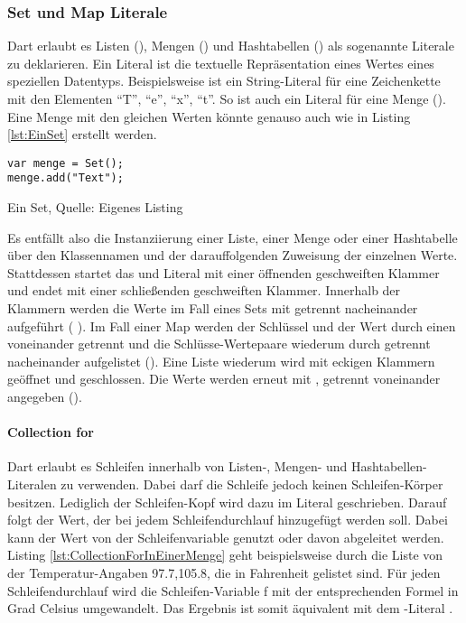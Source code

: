 \subsubsection{Set und Map Literale}

Dart erlaubt es Listen (), Mengen () und Hashtabellen () als sogenannte Literale zu deklarieren.
Ein Literal ist die textuelle Repräsentation eines Wertes eines speziellen Datentyps.
Beispielsweise ist   ein String-Literal für eine Zeichenkette mit den Elementen \enquote{T}, \enquote{e}, \enquote{x}, \enquote{t}.
So ist auch   ein Literal für eine Menge ().
Eine Menge mit den gleichen Werten könnte genauso auch wie in Listing \ref{lst:EinSet} erstellt werden.

\ifincludeall
  \begin{listing}[ht]
    \begin{verbatim}
var menge = Set();
menge.add("Text");
\end{verbatim}
    \caption[Ein Set]{Ein Set, Quelle: Eigenes Listing}
    \label{lst:EinSet}
  \end{listing}
\fi

Es entfällt also die Instanziierung einer Liste, einer Menge oder einer Hashtabelle über den Klassennamen und der darauffolgenden Zuweisung der einzelnen Werte.
Stattdessen startet das  und  Literal mit einer öffnenden geschweiften Klammer und endet mit einer schließenden geschweiften Klammer.
Innerhalb der Klammern werden die Werte im Fall eines Sets mit \IC{,} getrennt nacheinander aufgeführt (  ).
Im Fall einer Map werden der Schlüssel und der Wert durch einen \IC{:} voneinander getrennt und die Schlüsse-Wertepaare wiederum durch \IC{,} getrennt nacheinander aufgelistet ().
Eine Liste wiederum wird mit eckigen Klammern geöffnet und geschlossen.
Die Werte werden erneut mit , getrennt voneinander angegeben (\IC{[1,2]}).

\paragraph{Collection for} Dart erlaubt es Schleifen innerhalb von Listen-, Mengen- und Hashtabellen-Literalen zu verwenden.
Dabei darf die Schleife jedoch keinen Schleifen-Körper besitzen.
Lediglich der Schleifen-Kopf wird dazu im Literal geschrieben.
Darauf folgt der Wert, der bei jedem Schleifendurchlauf hinzugefügt werden soll.
Dabei kann der Wert von der Schleifenvariable genutzt oder davon abgeleitet werden.
Listing \ref{lst:CollectionForInEinerMenge} geht beispielsweise durch die Liste von der Temperatur-Angaben 97.7,105.8, die in Fahrenheit gelistet sind.
Für jeden Schleifendurchlauf wird die Schleifen-Variable f mit der entsprechenden Formel in Grad Celsius umgewandelt.
Das Ergebnis ist somit äquivalent mit dem -Literal .


